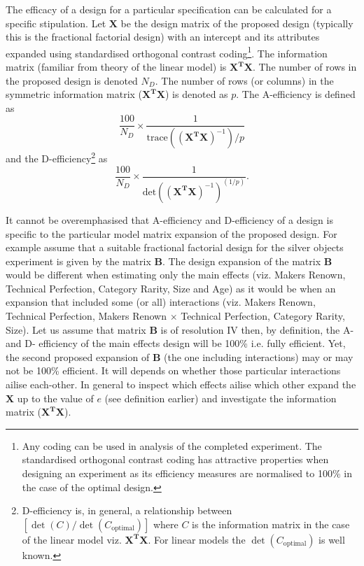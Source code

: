 \documentclass[article, crop=false]{standalone}
\begin{document}
The efficacy of a design for a particular specification can be calculated for a specific stipulation.
Let $\mathbf{X}$ be the design matrix of the proposed design (typically this is the fractional factorial design) with an intercept and its attributes expanded using standardised orthogonal contrast coding\footnote{Any coding can be used in analysis of the completed experiment. The standardised orthogonal contrast coding has attractive properties when designing an experiment as its efficiency measures are normalised to 100\% in the case of the optimal design.}.
The information matrix (familiar from theory of the linear model) is $\mathbf{X^{T}X}$.
The number of rows in the proposed design is denoted $N_D$.
The number of rows (or columns) in the symmetric information matrix ($\mathbf{X^{T}X}$) is denoted as $p$.
The A-efficiency is defined as
\begin{equation}
\dfrac{100}{N_D} \times \dfrac{1}{\text{trace} ((\mathbf{X^{T}X})^{-1})/p}
\end{equation}
and the D-efficiency\footnote{D-efficiency is, in general, a relationship between $[\det(C)/\det(C_{\text{optimal}})]$ where $C$ is the information matrix in the case of the linear model viz. $\mathbf{X^{T}X}$. For linear models the $\det(C_{\text{optimal}})$ is well known.} as
\begin{equation}
  \dfrac{100}{N_D} \times \dfrac{1}{ \text{det} ((\mathbf{X^{T}X})^{-1})^{(1/p)}}.
\end{equation}

It cannot be overemphasised that A-efficiency and D-efficiency of a design is specific to the particular model matrix expansion of the proposed design.
For example assume that a suitable fractional factorial design for the silver objects experiment is given by the matrix $\mathbf{B}$.
The design expansion of the matrix $\mathbf{B}$ would be different when estimating only the main effects (viz. Makers Renown, Technical Perfection, Category Rarity, Size and Age) as it would be when an expansion that included some (or all) interactions (viz. Makers Renown, Technical Perfection, Makers Renown $\times$ Technical Perfection, Category Rarity, Size).
Let us assume that matrix $\mathbf{B}$ is of resolution IV then, by definition, the A- and D- efficiency of the main effects design will be 100\% i.e. fully efficient.
Yet, the second proposed expansion of $\mathbf{B}$ (the one including interactions) may or may not be 100\% efficient.
It will depends on whether those particular interactions ailise each-other.
In general to inspect which effects ailise which other expand the $\mathbf{X}$ up to the value of $e$ (see definition earlier) and investigate the information matrix ($\mathbf{X^{T}X}$).
\end{document}
